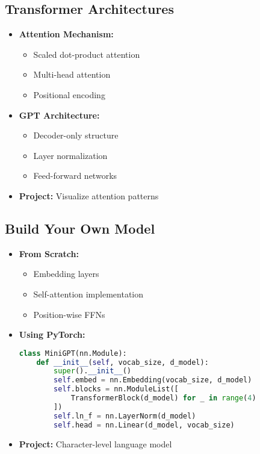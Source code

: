 \documentclass{article}
\begin{document}
\subsection{Transformer Architectures}
\begin{itemize}
\item \textbf{Attention Mechanism:}
    \begin{itemize}
    \item Scaled dot-product attention
    \item Multi-head attention
    \item Positional encoding
    \end{itemize}
    
\item \textbf{GPT Architecture:}
    \begin{itemize}
    \item Decoder-only structure
    \item Layer normalization
    \item Feed-forward networks
    \end{itemize}
    
\item \textbf{Project:} Visualize attention patterns
\end{itemize}

\subsection{Build Your Own Model}
\begin{itemize}
\item \textbf{From Scratch:}
    \begin{itemize}
    \item Embedding layers
    \item Self-attention implementation
    \item Position-wise FFNs
    \end{itemize}
    
\item \textbf{Using PyTorch:}
\begin{lstlisting}[language=Python]
class MiniGPT(nn.Module):
    def __init__(self, vocab_size, d_model):
        super().__init__()
        self.embed = nn.Embedding(vocab_size, d_model)
        self.blocks = nn.ModuleList([
            TransformerBlock(d_model) for _ in range(4)
        ])
        self.ln_f = nn.LayerNorm(d_model)
        self.head = nn.Linear(d_model, vocab_size)
\end{lstlisting}

\item \textbf{Project:} Character-level language model
\end{itemize}
\end{document}
